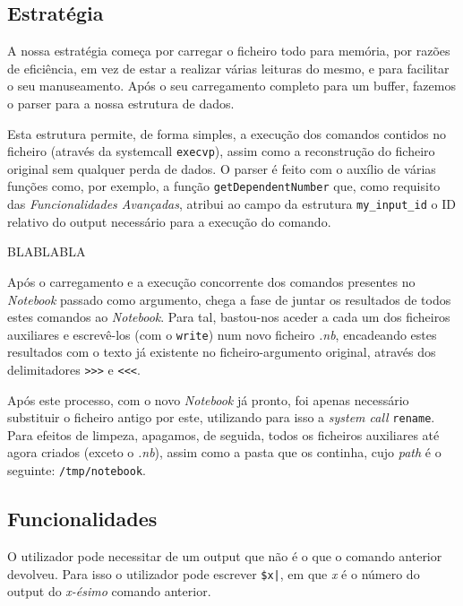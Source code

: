 \documentclass[a4paper]{article}
\begin{document}
\subsection{Estratégia}

A nossa estratégia começa por carregar o ficheiro todo para memória, por razões de eficiência, em vez de estar a realizar várias 
leituras do mesmo, e para facilitar o seu manuseamento. Após o seu carregamento completo para um buffer, fazemos o parser para a nossa 
estrutura de dados. 


Esta estrutura permite, de forma simples, a execução dos comandos contidos no ficheiro (através da systemcall \texttt{execvp}),
assim como a reconstrução do ficheiro original sem qualquer perda de dados. O parser é feito com o auxílio de várias funções como, por 
exemplo, a função \texttt {getDependentNumber} que, como requisito das \textit{Funcionalidades Avançadas}, atribui ao campo da 
estrutura \texttt{my\_input\_id} o ID relativo do output necessário para a execução do comando.

BLABLABLA

Após o carregamento e a execução concorrente dos comandos presentes no \textit{Notebook} passado como argumento, chega a fase de juntar os resultados de todos estes comandos ao \textit{Notebook}. Para tal, bastou-nos aceder a cada um dos ficheiros auxiliares e escrevê-los (com o \texttt{write}) num novo ficheiro \textit{.nb}, encadeando estes resultados com o texto já existente no ficheiro-argumento original, através dos delimitadores \texttt{>>>} e \texttt{<<<}. 

Após este processo, com o novo \textit{Notebook} já pronto, foi apenas necessário substituir o ficheiro antigo por este, utilizando para isso a \textit{system call} \texttt{rename}. Para efeitos de limpeza, apagamos, de seguida, todos os ficheiros auxiliares até agora criados (exceto o \textit{.nb}), assim como a pasta que os continha, cujo \textit{path} é o seguinte: \texttt{/tmp/notebook}.


\subsection{Funcionalidades}
\label{sec:funcionalidades}

O utilizador pode necessitar de um output que não é o que o comando anterior devolveu. Para isso o utilizador pode escrever 
\texttt{\$x|}, em que \textit{x} é o número do output do \textit{x-ésimo} comando anterior. 
\end{document}

